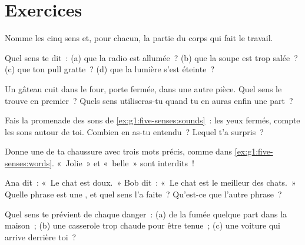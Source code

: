 \section{Exercices}

\begin{exercise}[$\star$]\label{exo:g1:five-senses:1}
Nomme les cinq sens et, pour chacun, la partie du corps qui fait le
travail.
\end{exercise}

\begin{exercise}[$\star$]\label{exo:g1:five-senses:2}
Quel sens te dit~: (a) que la radio est allumée~? (b) que la soupe
est trop salée~? (c) que ton pull gratte~? (d) que la lumière s'est
éteinte~?
\end{exercise}

\begin{exercise}[$\star$]\label{exo:g1:five-senses:3}
Un gâteau cuit dans le four, porte fermée, dans une autre pièce.
Quel sens le trouve en premier~? Quels sens utiliseras-tu quand tu en
auras enfin une part~?
\end{exercise}

\begin{exercise}[$\star$]\label{exo:g1:five-senses:4}
Fais la promenade des sons de \cref{ex:g1:five-senses:sounds}~: les
yeux fermés, compte les sons autour de toi. Combien en as-tu
entendu~? Lequel t'a surpris~?
\end{exercise}

\begin{exercise}[$\star$]\label{exo:g1:five-senses:5}
Donne une  de ta chaussure avec trois mots précis, comme
dans \cref{ex:g1:five-senses:words}. «~Jolie~» et «~belle~» sont
interdits~!
\end{exercise}

\begin{exercise}[$\star$]\label{exo:g1:five-senses:6}
Ana dit~: «~Le chat est doux.~» Bob dit~: «~Le chat est le meilleur
des chats.~» Quelle phrase est une , et quel sens l'a
faite~? Qu'est-ce que l'autre phrase~?
\end{exercise}

\begin{exercise}[$\star$]\label{exo:g1:five-senses:7}
Quel sens te prévient de chaque danger~: (a) de la fumée quelque part
dans la maison~; (b) une casserole trop chaude pour être tenue~;
(c) une voiture qui arrive derrière toi~?
\end{exercise}

